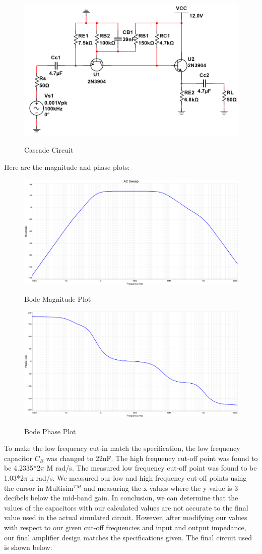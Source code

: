 \documentclass[12pt]{article}
\begin{document}
\begin{figure}[h!]
\centering
\includegraphics[height=0.25\textwidth]{Images/part_2_bode.png}\\
\caption{Cascade Circuit }
\label{fig:cascadecircuit}
\end{figure}
\FloatBarrier
Here are the magnitude and phase plots:
\begin{figure}[h!]
\centering
\includegraphics[height=0.4\textwidth]{Images/part_2_bode_plot.png}\\
\caption{Bode Magnitude Plot }
\label{fig:magplot}
\end{figure}
\begin{figure}[h!]
\centering
\includegraphics[height=0.35\textwidth]{Images/part_2_phase.png}\\
\caption{Bode Phase Plot}
\label{fig:phaseplot}
\end{figure}
\FloatBarrier
To make the low frequency cut-in match the specification, the low frequency capacitor $C_B$ was changed to 22nF. The high frequency cut-off point was found to be 4.2335*2$\pi$ M rad/s. The measured low frequency cut-off point was found to be 1.03*2$\pi$ k rad/s. We measured our low and high frequency cut-off points using the cursor in Multisim$^{TM}$ and measuring the x-values where the y-value is 3 decibels below the mid-band gain. In conclusion, we can determine that the values of the capacitors with our calculated values are not accurate to the final value used in the actual simulated circuit. However, after modifying our values with respect to our given cut-off frequencies and input and output impedance, our final amplifier design matches the specifications given.
The final circuit used is shown below:
\end{document}
